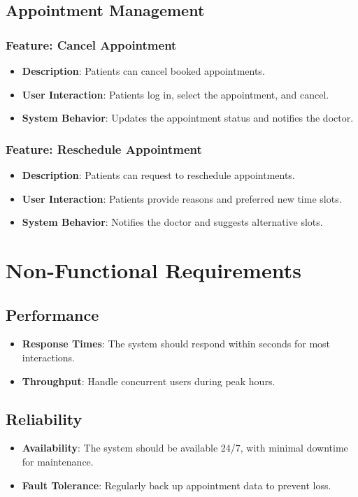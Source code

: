 \documentclass[a4paper, 12pt]{article}
\begin{document}
\subsection{Appointment Management}
\subsubsection{Feature: Cancel Appointment}
\begin{itemize}
    \item \textbf{Description}: Patients can cancel booked appointments.
    \item \textbf{User Interaction}: Patients log in, select the appointment, and cancel.
    \item \textbf{System Behavior}: Updates the appointment status and notifies the doctor.
\end{itemize}

\subsubsection{Feature: Reschedule Appointment}
\begin{itemize}
    \item \textbf{Description}: Patients can request to reschedule appointments.
    \item \textbf{User Interaction}: Patients provide reasons and preferred new time slots.
    \item \textbf{System Behavior}: Notifies the doctor and suggests alternative slots.
\end{itemize}

\section{Non-Functional Requirements}

\subsection{Performance}
\begin{itemize}
    \item \textbf{Response Times}: The system should respond within seconds for most interactions.
    \item \textbf{Throughput}: Handle concurrent users during peak hours.
\end{itemize}

\subsection{Reliability}
\begin{itemize}
    \item \textbf{Availability}: The system should be available 24/7, with minimal downtime for maintenance.
    \item \textbf{Fault Tolerance}: Regularly back up appointment data to prevent loss.
\end{itemize}
\end{document}
